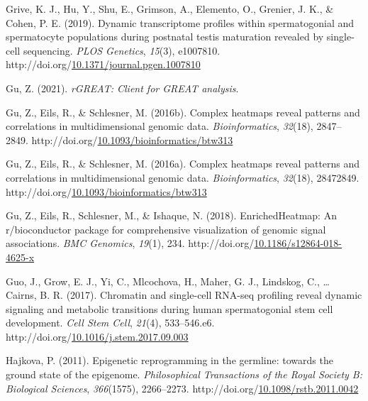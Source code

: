 \documentclass[12pt,twoside]{reedthesis}
\newlength{\cslhangindent}
\newenvironment{CSLReferences}[2] %
 {%
  \setlength{\parindent}{0pt}
  \ifodd #1 \everypar{\setlength{\hangindent}{\cslhangindent}}\ignorespaces\fi
  \ifnum #2 > 0
  \setlength{\parskip}{#2\baselineskip}
  \fi
 }%
 {}
\begin{document}
\begin{CSLReferences}{1}{0}
\leavevmode{}%
Grive, K. J., Hu, Y., Shu, E., Grimson, A., Elemento, O., Grenier, J. K., \& Cohen, P. E. (2019). Dynamic transcriptome profiles within spermatogonial and spermatocyte populations during postnatal testis maturation revealed by single-cell sequencing. \emph{PLOS Genetics}, \emph{15}(3), e1007810. http://doi.org/\href{https://doi.org/10.1371/journal.pgen.1007810}{10.1371/journal.pgen.1007810}

\leavevmode{}%
Gu, Z. (2021). \emph{rGREAT: Client for GREAT analysis}.

\leavevmode{}%
Gu, Z., Eils, R., \& Schlesner, M. (2016b). Complex heatmaps reveal patterns and correlations in multidimensional genomic data. \emph{Bioinformatics}, \emph{32}(18), 2847--2849. http://doi.org/\href{https://doi.org/10.1093/bioinformatics/btw313}{10.1093/bioinformatics/btw313}

\leavevmode{}%
Gu, Z., Eils, R., \& Schlesner, M. (2016a). Complex heatmaps reveal patterns and correlations in multidimensional genomic data. \emph{Bioinformatics}, \emph{32}(18), 28472849. http://doi.org/\href{https://doi.org/10.1093/bioinformatics/btw313}{10.1093/bioinformatics/btw313}

\leavevmode{}%
Gu, Z., Eils, R., Schlesner, M., \& Ishaque, N. (2018). EnrichedHeatmap: An r/bioconductor package for comprehensive visualization of genomic signal associations. \emph{BMC Genomics}, \emph{19}(1), 234. http://doi.org/\href{https://doi.org/10.1186/s12864-018-4625-x}{10.1186/s12864-018-4625-x}

\leavevmode{}%
Guo, J., Grow, E. J., Yi, C., Mlcochova, H., Maher, G. J., Lindskog, C., \ldots{} Cairns, B. R. (2017). Chromatin and single-cell RNA-seq profiling reveal dynamic signaling and metabolic transitions during human spermatogonial stem cell development. \emph{Cell Stem Cell}, \emph{21}(4), 533--546.e6. http://doi.org/\href{https://doi.org/10.1016/j.stem.2017.09.003}{10.1016/j.stem.2017.09.003}

\leavevmode{}%
Hajkova, P. (2011). Epigenetic reprogramming in the germline: towards the ground state of the epigenome. \emph{Philosophical Transactions of the Royal Society B: Biological Sciences}, \emph{366}(1575), 2266--2273. http://doi.org/\href{https://doi.org/10.1098/rstb.2011.0042}{10.1098/rstb.2011.0042}


\end{CSLReferences}
\end{document}
